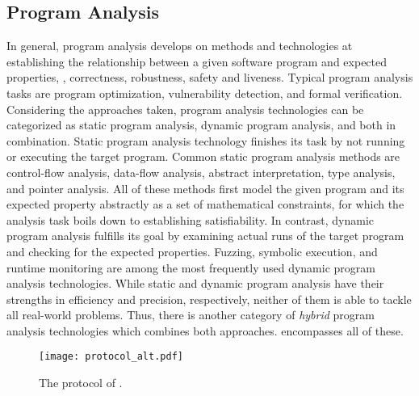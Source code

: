 \subsection{Program Analysis}
\label{subsec:pa}
In general, program analysis develops on methods and technologies at establishing the relationship 
between a given software program and expected properties, \eg, correctness, robustness, safety 
and liveness. Typical program analysis tasks are program optimization, vulnerability detection, 
and formal verification. Considering the approaches taken, program analysis technologies can be 
categorized as static program analysis, dynamic program analysis, and both in combination.
Static program analysis technology finishes its task by not running or executing the target program. 
Common static program analysis methods are control-flow analysis, data-flow analysis, 
abstract interpretation, type analysis, and pointer analysis. All of these methods first model 
the given program and its expected property abstractly as a set of mathematical constraints, for which the analysis task boils down to establishing satisfiability. 
In contrast, dynamic program analysis fulfills its goal by examining actual runs of the target program  and checking for the expected properties. 
Fuzzing, symbolic execution, and runtime monitoring are among the
most frequently used dynamic program analysis technologies. While static and dynamic program analysis 
have their strengths in efficiency and precision, respectively, neither of them is able to tackle all 
real-world problems. Thus, there is another category of \emph{hybrid} program analysis technologies which 
combines both approaches. \tcpa encompasses all of these.

\begin{figure*}[h]
	\centering
	\texttt{[image: protocol\_alt.pdf]}
	\caption{\label{fig:protocol}The protocol of \tcpa.}
\end{figure*}